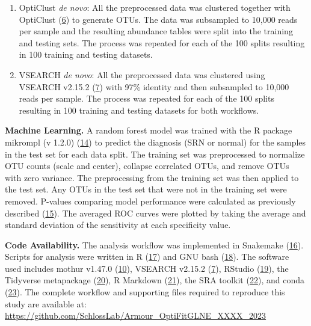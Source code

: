 \documentclass[
]{article}
\providecommand{\tightlist}{%
  \setlength{\itemsep}{0pt}\setlength{\parskip}{0pt}}
\begin{document}
\begin{enumerate}
\def\labelenumi{\arabic{enumi}.}
\setcounter{enumi}{3}
\tightlist
\item
  OptiClust \emph{de novo}: All the preprocessed data was clustered
  together with OptiClust (\protect\hyperlink{ref-westcott2017}{6}) to
  generate OTUs. The data was subsampled to 10,000 reads per sample and
  the resulting abundance tables were split into the training and
  testing sets. The process was repeated for each of the 100 splits
  resulting in 100 training and testing datasets.
\item
  VSEARCH \emph{de novo}: All the preprocessed data was clustered using
  VSEARCH v2.15.2 (\protect\hyperlink{ref-rognes2016}{7}) with 97\%
  identity and then subsampled to 10,000 reads per sample. The process
  was repeated for each of the 100 splits resulting in 100 training and
  testing datasets for both workflows.
\end{enumerate}

\textbf{Machine Learning.} A random forest model was trained with the R
package mikrompl (v 1.2.0)
(\protect\hyperlink{ref-topuxe7uoglu2021}{14}) to predict the diagnosis
(SRN or normal) for the samples in the test set for each data split. The
training set was preprocessed to normalize OTU counts (scale and
center), collapse correlated OTUs, and remove OTUs with zero variance.
The preprocessing from the training set was then applied to the test
set. Any OTUs in the test set that were not in the training set were
removed. P-values comparing model performance were calculated as
previously described (\protect\hyperlink{ref-topuxe7uoglu2020}{15}). The
averaged ROC curves were plotted by taking the average and standard
deviation of the sensitivity at each specificity value.

\textbf{Code Availability.} The analysis workflow was implemented in
Snakemake (\protect\hyperlink{ref-koster2012}{16}). Scripts for analysis
were written in R (\protect\hyperlink{ref-R2020}{17}) and GNU bash
(\protect\hyperlink{ref-GNUbash}{18}). The software used includes mothur
v1.47.0 (\protect\hyperlink{ref-schloss2009}{10}), VSEARCH v2.15.2
(\protect\hyperlink{ref-rognes2016}{7}), RStudio
(\protect\hyperlink{ref-RStudio2019}{19}), the Tidyverse metapackage
(\protect\hyperlink{ref-wickham2019}{20}), R Markdown
(\protect\hyperlink{ref-xie_r_2018}{21}), the SRA toolkit
(\protect\hyperlink{ref-noauthor_sra-tools_nodate}{22}), and conda
(\protect\hyperlink{ref-noauthor_anaconda_2016}{23}). The complete
workflow and supporting files required to reproduce this study are
available at:
\url{https://github.com/SchlossLab/Armour_OptiFitGLNE_XXXX_2023}
\end{document}

